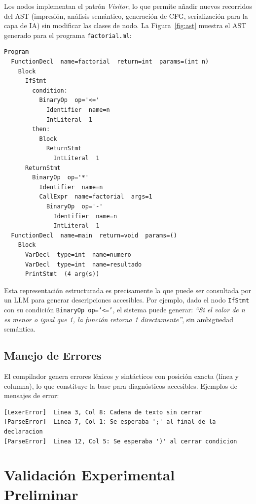 \documentclass[conference]{IEEEtran}
\begin{document}
Los nodos implementan el patrón \textit{Visitor}, lo que permite añadir nuevos recorridos del AST (impresión, análisis semántico, generación de CFG, serialización para la capa de IA) sin modificar las clases de nodo. La Figura~\ref{fig:ast} muestra el AST generado para el programa \texttt{factorial.ml}:

\begin{lstlisting}[language={},numbers=none,caption={AST generado para factorial.ml por el ASTPrinter}]
Program
  FunctionDecl  name=factorial  return=int  params=(int n)
    Block
      IfStmt
        condition:
          BinaryOp  op='<='
            Identifier  name=n
            IntLiteral  1
        then:
          Block
            ReturnStmt
              IntLiteral  1
      ReturnStmt
        BinaryOp  op='*'
          Identifier  name=n
          CallExpr  name=factorial  args=1
            BinaryOp  op='-'
              Identifier  name=n
              IntLiteral  1
  FunctionDecl  name=main  return=void  params=()
    Block
      VarDecl  type=int  name=numero
      VarDecl  type=int  name=resultado
      PrintStmt  (4 arg(s))
\end{lstlisting}

Esta representación estructurada es precisamente la que puede ser consultada por un LLM para generar descripciones accesibles. Por ejemplo, dado el nodo \texttt{IfStmt} con su condición \texttt{BinaryOp op='<='}, el sistema puede generar: \textit{``Si el valor de n es menor o igual que 1, la función retorna 1 directamente''}, sin ambigüedad semántica.

\subsection{Manejo de Errores}

El compilador genera errores léxicos y sintácticos con posición exacta (línea y columna), lo que constituye la base para diagnósticos accesibles. Ejemplos de mensajes de error:

\begin{lstlisting}[language={},numbers=none]
[LexerError]  Linea 3, Col 8: Cadena de texto sin cerrar
[ParseError]  Linea 7, Col 1: Se esperaba ';' al final de la declaracion
[ParseError]  Linea 12, Col 5: Se esperaba ')' al cerrar condicion
\end{lstlisting}

\section{Validación Experimental Preliminar}
\end{document}

